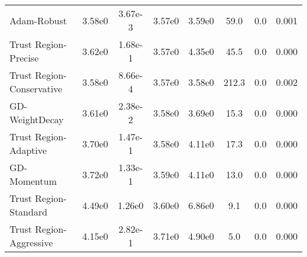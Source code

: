 \documentclass{article}
\begin{document}
\begin{table}[htbp]
{\begin{tabular}{p{2.5cm}*{7}{c}}
Adam-Robust & 3.58e0 & 3.67e-3 & 3.57e0 & 3.59e0 & 59.0 & 0.0 & 0.001 \\
Trust Region-Precise & 3.62e0 & 1.68e-1 & 3.57e0 & 4.35e0 & 45.5 & 0.0 & 0.000 \\
Trust Region-Conservative & 3.58e0 & 8.66e-4 & 3.57e0 & 3.58e0 & 212.3 & 0.0 & 0.002 \\
GD-WeightDecay & 3.61e0 & 2.38e-2 & 3.58e0 & 3.69e0 & 15.3 & 0.0 & 0.000 \\
Trust Region-Adaptive & 3.70e0 & 1.47e-1 & 3.58e0 & 4.11e0 & 17.3 & 0.0 & 0.000 \\
GD-Momentum & 3.72e0 & 1.33e-1 & 3.59e0 & 4.11e0 & 13.0 & 0.0 & 0.000 \\
Trust Region-Standard & 4.49e0 & 1.26e0 & 3.60e0 & 6.86e0 & 9.1 & 0.0 & 0.000 \\
Trust Region-Aggressive & 4.15e0 & 2.82e-1 & 3.71e0 & 4.90e0 & 5.0 & 0.0 & 0.000 \\
\bottomrule
\end{tabular}
}
\end{table}
\end{document}
